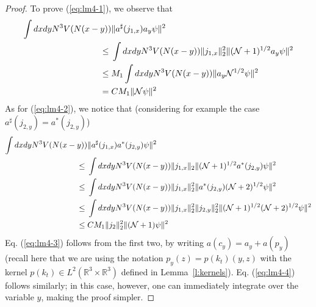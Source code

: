 \documentclass[11pt,a4paper,DIV11]{scrartcl}	%
\newcommand{\bR}{{\mathbb R}}
\newcommand{\cN}{{\cal N}}
\begin{document}
\begin{proof}
To prove (\ref{eq:lm4-1}), we observe that
\[ \begin{split} \int dx dy N^3 V (N (x-y)) & \| a^\sharp (j_{1,x}) a_y \psi \|^2 \\ \leq \; & \int dx dy N^3 V (N (x-y)) \| j_{1,x} \|_2^2 \| (\cN+1)^{1/2} a_y \psi \|^2 \\ \leq \; & M_1 \int dx dy N^3 V (N (x-y)) \| a_y \cN^{1/2} \psi \|^2 \\ = \; &C M_1 \| \cN \psi \|^2 \end{split} \]
As for (\ref{eq:lm4-2}), we notice that (considering for example the case $a^\sharp (j_{2,y}) = a^* (j_{2,y})$) 
\[ \begin{split} 
\int dx dy N^3 V(N (x-y)) & \| a^\sharp (j_{1,x}) a^* (j_{2,y}) \psi \|^2 \\ \leq \; & \int dx dy N^3 V (N (x-y)) \| j_{1,x} \|_2 \| (\cN+1)^{1/2} a^* (j_{2,y}) \psi \|^2 \\ \leq \; & \int dx dy N^3 V (N (x-y)) \| j_{1,x} \|^2_2 \| a^* (j_{2,y}) (\cN+2)^{1/2} \psi \|^2  \\ \leq \; & \int dx dy N^3 V (N (x-y)) \| j_{1,x} \|^2_2  \| j_{2,y} \|_2^2 \| (\cN+1)^{1/2} (\cN+2)^{1/2} \psi \|^2 \\ \leq \; & C M_1 \| j_2 \|^2_{2} \| (\cN+1) \psi \|^2  \end{split} \]
Eq. (\ref{eq:lm4-3}) follows from the first two, by writing $a (c_y) = a_y + a (p_y)$ (recall here that we are using the notation $p_y (z) = p (k_t) (y,z)$ with the kernel $p (k_t) \in L^2 (\bR^3 \times \bR^3)$ defined in Lemma~\ref{l:kernels}). Eq. (\ref{eq:lm4-4}) follows similarly; in this case, however, one can immediately integrate over the variable $y$, making the proof simpler. 
\end{proof}
\end{document}
